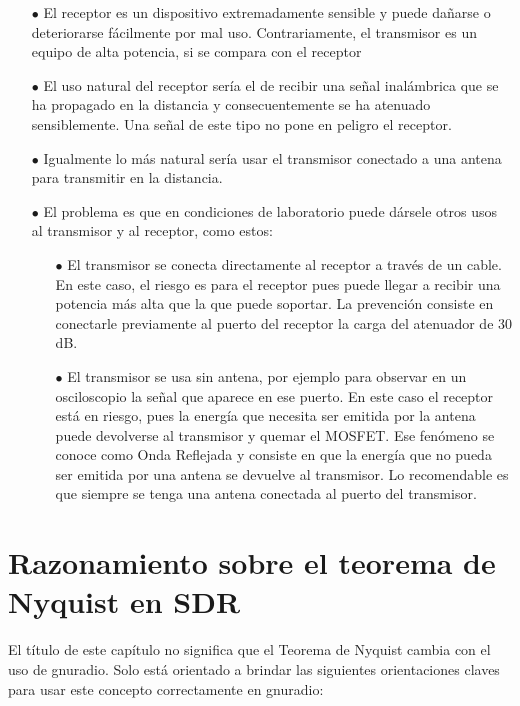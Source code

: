 \begin{itemize}
	\item [$\bullet$] El receptor es un dispositivo extremadamente sensible y puede dañarse o deteriorarse fácilmente por mal uso. Contrariamente, el transmisor es un equipo de alta potencia, si se compara con el receptor
	\item [$\bullet$] El uso natural del receptor sería el de recibir una señal inalámbrica que se ha propagado en la distancia y consecuentemente se ha atenuado sensiblemente. Una señal de este tipo no pone en peligro el receptor.
	\item [$\bullet$] Igualmente lo más natural sería usar el transmisor conectado a una antena para transmitir en la distancia.
	\item [$\bullet$] El problema es que en condiciones de laboratorio puede dársele otros usos al transmisor y al receptor, como estos:
	\begin{itemize}
		\item [$\bullet$] El transmisor se conecta directamente al receptor a través de un cable. En este caso, el riesgo es para el receptor pues puede llegar a recibir una potencia más alta que la que puede soportar. La prevención consiste en conectarle previamente al puerto del receptor la carga del atenuador de 30 dB.
		\item [$\bullet$] El transmisor se usa sin antena, por ejemplo para observar en un osciloscopio la señal que aparece en ese puerto. En este caso el receptor está en riesgo, pues la energía que necesita ser emitida por la antena puede devolverse al transmisor y quemar el MOSFET. Ese fenómeno se conoce como Onda Reflejada y consiste en que la energía que no pueda ser emitida por una antena se devuelve al transmisor.  Lo recomendable es que siempre se tenga una antena conectada al puerto del transmisor.
	\end{itemize}
\end{itemize}


\section{Razonamiento sobre el teorema de Nyquist en SDR}

El título de este capítulo no significa que el Teorema de Nyquist cambia con el uso de gnuradio. Solo está orientado a brindar las siguientes orientaciones claves para usar este concepto correctamente en gnuradio:

